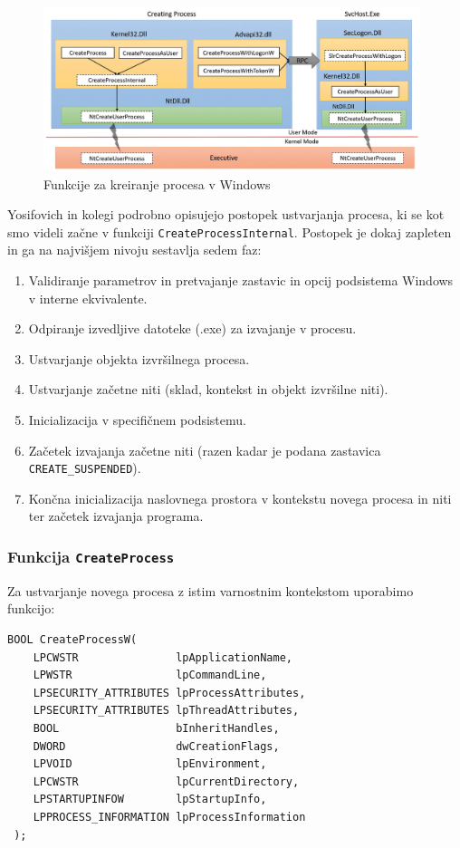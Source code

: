 \documentclass[a4paper,12pt,openright]{book}
\begin{document}
\begin{figure}[h!]
	\begin{center}
		\includegraphics[width=0.98\textwidth]{images/windows_createprocess_functions.png}
	\end{center}
	\caption{Funkcije za kreiranje procesa v Windows \cite{Yosifovich_Russinovich_Solomon_Ionescu_2017}}
	\label{fig:windows_createprocess_functions}
\end{figure}

Yosifovich in kolegi \cite{Yosifovich_Russinovich_Solomon_Ionescu_2017} podrobno opisujejo postopek ustvarjanja procesa, ki se kot smo videli začne v funkciji \texttt{CreateProcessInternal}.
Postopek je dokaj zapleten in ga na najvišjem nivoju sestavlja sedem faz:
\begin{enumerate}
	\item Validiranje parametrov in pretvajanje zastavic in opcij podsistema Windows v interne ekvivalente.
	\item Odpiranje izvedljive datoteke (.exe) za izvajanje v procesu.
	\item Ustvarjanje objekta izvršilnega procesa.
	\item Ustvarjanje začetne niti (sklad, kontekst in objekt izvršilne niti).
	\item Inicializacija v specifičnem podsistemu.
	\item Začetek izvajanja začetne niti (razen kadar je podana zastavica \texttt{CREATE\-\_SUSPENDED}).
	\item Končna inicializacija naslovnega prostora v kontekstu novega procesa in niti ter začetek izvajanja programa.
\end{enumerate}

\subsubsection{Funkcija \texttt{CreateProcess}}

Za ustvarjanje novega procesa z istim varnostnim kontekstom uporabimo funkcijo:
\begin{lstlisting}[style=func]
 BOOL CreateProcessW(
	LPCWSTR               lpApplicationName,
	LPWSTR                lpCommandLine,
	LPSECURITY_ATTRIBUTES lpProcessAttributes,
	LPSECURITY_ATTRIBUTES lpThreadAttributes,
	BOOL                  bInheritHandles,
	DWORD                 dwCreationFlags,
	LPVOID                lpEnvironment,
	LPCWSTR               lpCurrentDirectory,
	LPSTARTUPINFOW        lpStartupInfo,
	LPPROCESS_INFORMATION lpProcessInformation
 );
\end{lstlisting}
\end{document}
